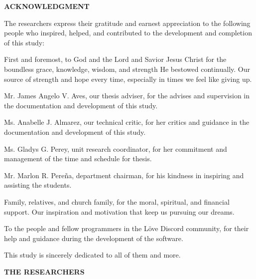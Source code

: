 \begin{doublespace}
	\thispagestyle{empty}

	\begin{center}
		\textbf{ACKNOWLEDGMENT}
	\end{center}

	\justify
	\hphantom{}

	\parx
	The researchers express their gratitude and earnest appreciation to the
	following people who inspired, helped, and contributed to the development
	and completion of this study:

	\parx
	First and foremost, to God and the Lord and Savior Jesus Christ for the
	boundless grace, knowledge, wisdom, and strength He bestowed continually.
	Our source of strength and hope every time, especially in times we feel
	like giving up.

	\parx
	Mr. James Angelo V. Aves, our thesis adviser, for the advises and supervision
	in the documentation and development of this study.

	\parx
	Ms. Anabelle J. Almarez, our technical critic, for her critics and guidance
	in the documentation and development of this study.

	\parx
	Ms. Gladys G. Perey, unit research coordinator, for her commitment and management
	of the time and schedule for thesis.

	\parx
	Mr. Marlon R. Pereña, department chairman, for his kindness in inspiring and
	assisting the students.

	\parx
	Family, relatives, and church family, for the moral, spiritual, and financial
	support. Our inspiration and motivation that keep us pursuing our dreams.

	\parx
	To the people and fellow programmers in the Löve Discord community, for their
	help and guidance during the development of the software.

	\parx
	This study is sincerely dedicated to all of them and more.

	\null\hfill \textbf{THE RESEARCHERS}
\end{doublespace}

